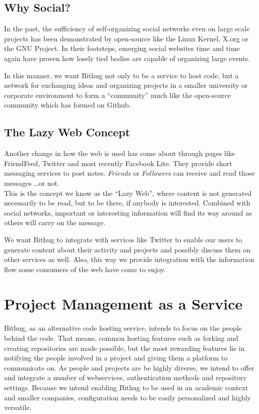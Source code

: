 \documentclass{llncs}
\begin{document}
\subsection{Why Social?}
In the past, the sufficiency of self-organizing social networks even on large 
scale projects has been demonstrated by open-source like the Linux 
Kernel\cite{kernel:www}, X.org\cite{xorg:www} or the GNU Project\cite{gnu:www}.
In their footsteps, emerging social websites time\cite{facebook:help} and 
time\cite{facebook:organize} again\cite{twitter:organize} have proven how losely
tied bodies are capable of organizing large events.

In this manner, we want Bithug not only to be a service to host code, but a 
network for exchanging ideas and organizing projects in a smaller university 
or corporate environment to form a ``community'' much like the open-source 
community which has formed on Github.
\subsection{The Lazy Web Concept}
Another change in how the web is used has come about through pages like 
FriendFeed, Twitter and most recently Facebook Lite. They provide short 
messaging services to post notes. \emph{Friends} or \emph{Followers} can
receive and read those messages \ldots or not. \\
This is the concept we know as the ``Lazy Web'', where content is not generated 
necessarily to be read, but to be there, if anybody is interested. Combined 
with social networks, important or interesting information will find its way 
around as others will carry on the message.

We want Bithug to integrate with services like Twitter to enable our users to
generate content about their activity and projects and possibly discuss them on
other services as well. Also, this way we provide integration with the 
information flow some consumers of the web have come to enjoy.

\section{Project Management as a Service}
Bithug, as an alternative code hosting service, intends to focus on the people 
behind the code. That means, common hosting features such as forking and creating 
repositories are made possible, but the most rewarding features lie in notifying 
the people involved in a project and giving them a platform to communicate on. As 
people and projects are be highly diverse, we intend to offer and integrate a 
number of webservices, authentication methods and repository settings. Because 
we intend enabling Bithug to be used in an academic context and smaller companies, 
configuration needs to be easily personalized and highly versatile.
\end{document}
